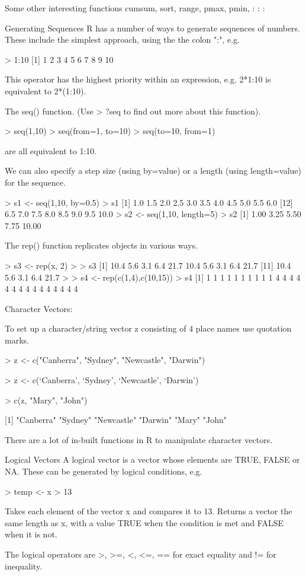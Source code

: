 Some other interesting functions 
cumsum, sort, range, pmax, pmin, : : :

Generating Sequences 
R has a number of ways to generate sequences of numbers. 
These include the simplest approach, using the the colon ":", e.g.

> 1:10
[1] 1 2 3 4 5 6 7 8 9 10

This operator has the highest priority within an expression, e.g. 2*1:10 is equivalent to 2*(1:10).
 
The seq() function. (Use > ?seq to find out more about this function).

> seq(1,10)
> seq(from=1, to=10)
> seq(to=10, from=1)

are all equivalent to 1:10.


We can also specify a step size (using by=value) or a length (using length=value) for the sequence.

> s1 <- seq(1,10, by=0.5)
> s1
[1] 1.0 1.5 2.0 2.5 3.0 3.5 4.0 4.5 5.0 5.5 6.0
[12] 6.5 7.0 7.5 8.0 8.5 9.0 9.5 10.0
> s2 <- seq(1,10, length=5)
> s2
[1] 1.00 3.25 5.50 7.75 10.00
  
The rep() function replicates objects in various ways.

> s3 <- rep(x, 2)
>
> s3
[1] 10.4 5.6 3.1 6.4 21.7 10.4 5.6 3.1 6.4 21.7
[11] 10.4 5.6 3.1 6.4 21.7
>
> s4 <- rep(c(1,4),c(10,15))
> s4
[1] 1 1 1 1 1 1 1 1 1 1 4 4 4 4 4 4 4 4 4 4 4 4 4 4 4

 Character Vectors:

To set up a character/string vector z consisting of 4 place names use quotation marks.

> z <- c("Canberra", "Sydney", "Newcastle", "Darwin")

> z <- c(`Canberra', `Sydney', `Newcastle', `Darwin')

> c(z, "Mary", "John")

[1] "Canberra" "Sydney" "Newcastle" "Darwin" "Mary" "John"

There are a lot of in-built functions in R to manipulate character vectors.

Logical Vectors
 A logical vector is a vector whose elements are TRUE, FALSE or NA.
 These can be generated by logical conditions, e.g.

> temp <- x > 13

Takes each element of the vector x and compares it to 13.
Returns a vector the same length as x, with a value TRUE when the condition is met and FALSE when it is not.
 
The logical operators are >, >=, <, <=, == for exact equality and != for inequality.



